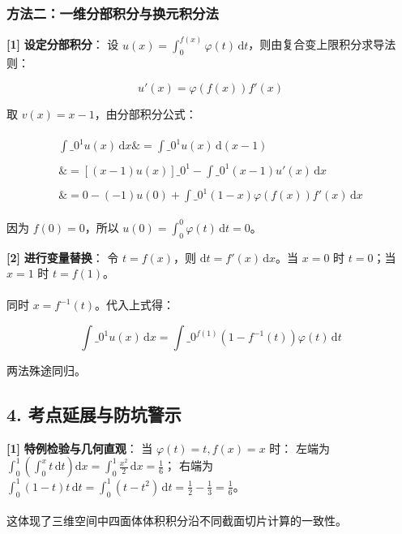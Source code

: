 \documentclass[11pt,a4paper,UTF8]{ctexart}
\begin{document}
\subsubsection{方法二：一维分部积分与换元积分法}
\begin{solbox}[分步推导与答题规范]
\textbf{[1]}  \textbf{设定分部积分}：
设 $u(x) = \int_0^{f(x)} \varphi(t)\,\mathrm{d}t$，则由复合变上限积分求导法则：

\begin{equation*}
u'(x) = \varphi(f(x))f'(x)
\end{equation*}

取 $v(x) = x - 1$，由分部积分公式：

\begin{align*}
\begin{aligned}
\int\_0^1 u(x)\,\mathrm{d}x \&= \int\_0^1 u(x)\,\mathrm{d}(x-1) \\ \\
\&= \left[ (x-1)u(x) \right]\_0^1 - \int\_0^1 (x-1)u'(x)\,\mathrm{d}x \\ \\
\&= 0 - (-1)u(0) + \int\_0^1 (1-x)\varphi(f(x))f'(x)\,\mathrm{d}x
\end{aligned}
\end{align*}

因为 $f(0) = 0$，所以 $u(0) = \int_0^0 \varphi(t)\,\mathrm{d}t = 0$。

\textbf{[2]}  \textbf{进行变量替换}：
令 $t = f(x)$，则 $\mathrm{d}t = f'(x)\,\mathrm{d}x$。当 $x = 0$ 时 $t = 0$；当 $x = 1$ 时 $t = f(1)$。\\ \\
同时 $x = f^{-1}(t)$。代入上式得：

\begin{equation*}
\int\_0^1 u(x)\,\mathrm{d}x = \int\_0^{f(1)} (1 - f^{-1}(t))\varphi(t)\,\mathrm{d}t
\end{equation*}

两法殊途同归。
\end{solbox}


\subsection{4. 考点延展与防坑警示}
\begin{solbox}[分步推导与答题规范]
\textbf{[1]}  \textbf{特例检验与几何直观}：
当 $\varphi(t) = t, f(x) = x$ 时：
左端为 $\int_0^1 \left(\int_0^x t\,\mathrm{d}t\right)\mathrm{d}x = \int_0^1 \frac{x^2}{2}\,\mathrm{d}x = \frac{1}{6}$；
右端为 $\int_0^1 (1-t)t\,\mathrm{d}t = \int_0^1 (t - t^2)\,\mathrm{d}t = \frac{1}{2} - \frac{1}{3} = \frac{1}{6}$。\\ \\
这体现了三维空间中四面体体积积分沿不同截面切片计算的一致性。
\end{solbox}
\end{document}

